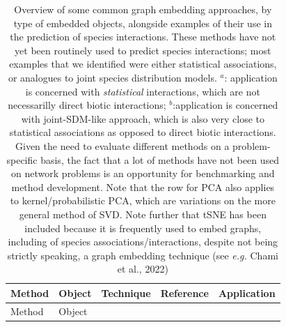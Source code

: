 \documentclass[11pt]{article}
\begin{document}
\hypertarget{tbl:methods}{}
\begin{longtable}[]{@{}lllll@{}}
\caption{\label{tbl:methods}Overview of some common graph embedding
approaches, by type of embedded objects, alongside examples of their use
in the prediction of species interactions. These methods have not yet
been routinely used to predict species interactions; most examples that
we identified were either statistical associations, or analogues to
joint species distribution models. \(^a\): application is concerned with
\emph{statistical} interactions, which are not necessarilly direct
biotic interactions; \(^b\):application is concerned with joint-SDM-like
approach, which is also very close to statistical associations as
opposed to direct biotic interactions. Given the need to evaluate
different methods on a problem-specific basis, the fact that a lot of
methods have not been used on network problems is an opportunity for
benchmarking and method development. Note that the row for PCA also
applies to kernel/probabilistic PCA, which are variations on the more
general method of SVD. Note further that tSNE has been included because
it is frequently used to embed graphs, including of species
associations/interactions, despite not being strictly speaking, a graph
embedding technique (see \emph{e.g.} Chami et al., 2022)}\tabularnewline
\toprule
\begin{minipage}[b]{0.09\columnwidth}\raggedright
Method\strut
\end{minipage} & \begin{minipage}[b]{0.11\columnwidth}\raggedright
Object\strut
\end{minipage} & \begin{minipage}[b]{0.23\columnwidth}\raggedright
Technique\strut
\end{minipage} & \begin{minipage}[b]{0.14\columnwidth}\raggedright
Reference\strut
\end{minipage} & \begin{minipage}[b]{0.29\columnwidth}\raggedright
Application\strut
\end{minipage}\tabularnewline
\midrule
\endfirsthead
\toprule
\begin{minipage}[b]{0.09\columnwidth}\raggedright
Method\strut
\end{minipage} & \begin{minipage}[b]{0.11\columnwidth}\raggedright
Object\strut
\end{minipage} & \begin{minipage}[b]{0.23\columnwidth}\raggedright

\end{minipage}
\end{longtable}
\end{document}
